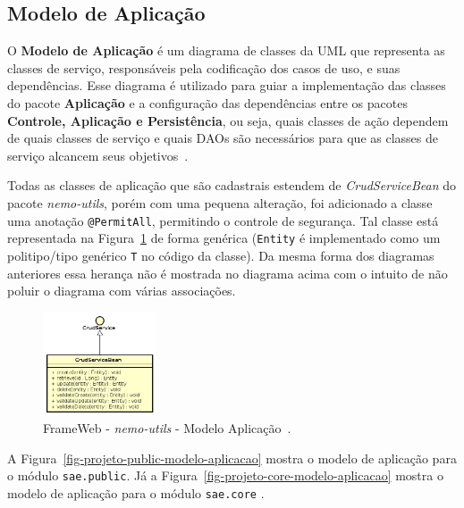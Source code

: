 \subsection{Modelo de Aplicação}

O \textbf{Modelo de Aplicação} é um diagrama de classes da UML que representa as classes de serviço, responsáveis pela codificação dos casos de uso, e suas dependências. Esse diagrama é utilizado para guiar a implementação das classes do pacote \textbf{Aplicação} e a configuração das dependências entre os pacotes \textbf{Controle, Aplicação e Persistência}, ou seja, quais classes de ação dependem de quais classes de serviço e quais DAOs são necessários para que as classes de serviço alcancem seus objetivos~\cite{vitorFrameWeb}.


Todas as classes de aplicação que são cadastrais estendem de \textit{CrudServiceBean} do pacote \textit{nemo-utils}, porém com uma pequena alteração, foi adicionado a classe uma anotação \texttt{@PermitAll}, permitindo o controle de segurança. Tal classe está representada na Figura~\ref{fig-projeto-nemo-utils-modelo-aplicacao} de forma genérica (\texttt{Entity} é implementado como um politipo/tipo genérico \texttt{T} no código da classe). Da mesma forma dos diagramas anteriores essa herança não é mostrada no diagrama acima com o intuito de não poluir o diagrama com várias associações.


\begin{figure}[h]
	\centering
	\includegraphics[width=0.3\textwidth]{figuras/projeto/fig-projeto-nemo-utils-modelo-aplicacao}
	\caption{FrameWeb - \textit{nemo-utils} - Modelo Aplicação~\cite{lima-pg15}.}
	\label{fig-projeto-nemo-utils-modelo-aplicacao}
\end{figure}



A Figura~\ref{fig-projeto-public-modelo-aplicacao} mostra o modelo de aplicação para o módulo \texttt{sae.public}. Já a Figura~\ref{fig-projeto-core-modelo-aplicacao} mostra o modelo de aplicação para o módulo \texttt{sae.core} .


